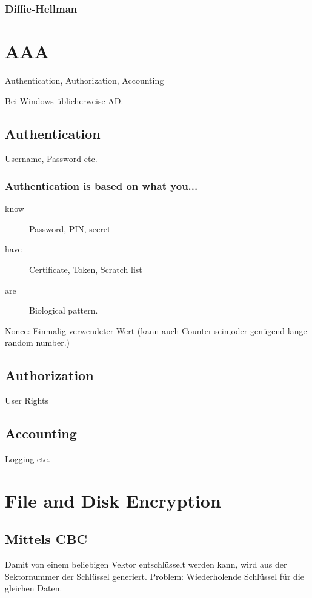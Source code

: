 \subsubsection{Diffie-Hellman}


\section{AAA}

Authentication, Authorization, Accounting

Bei Windows üblicherweise AD.

\subsection{Authentication}
Username, Password etc.

\subsubsection{Authentication is based on what you...}
\begin{description}
	\item[know]	Password, PIN, secret
	\item[have]	Certificate, Token, Scratch list
	\item[are]	Biological pattern.
\end{description}

Nonce: Einmalig verwendeter Wert (kann auch Counter sein,oder genügend lange random number.)

\subsection{Authorization}
User Rights


\subsection{Accounting}
Logging etc.


\section{File and Disk Encryption}

\subsection{Mittels CBC}
Damit von einem beliebigen Vektor entschlüsselt werden kann, wird aus der Sektornummer der Schlüssel generiert. Problem: Wiederholende Schlüssel für die gleichen Daten.


